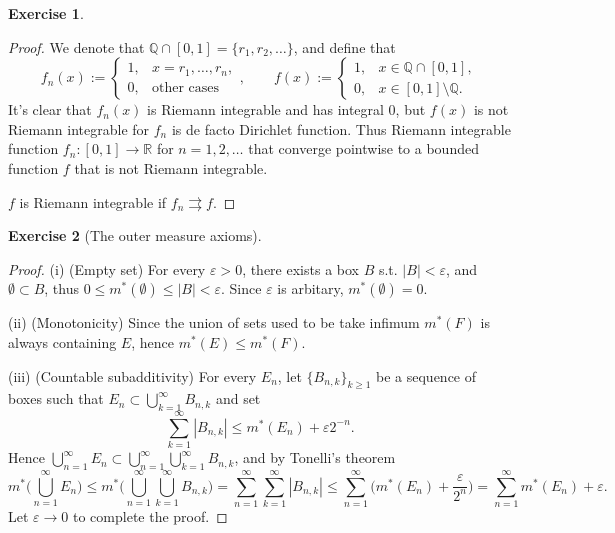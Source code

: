 \documentclass{article}
\newtheorem{ex}{Exercise}[subsection]
\begin{document}
\begin{ex}\end{ex}
\begin{proof}
We denote that $\mathbb{Q} \cap [0, 1] = \{r_1, r_2, \dots\}$, and define that $$
f_n(x) := \begin{cases}
    1, &x = r_1, \dots, r_n,\\
    0, &\text{other cases}
\end{cases}, \qquad
f(x) := \begin{cases}
    1, &x \in \mathbb{Q} \cap [0, 1],\\
    0, &x \in [0, 1]\setminus \mathbb{Q}.
\end{cases}
$$
It's clear that $f_n(x)$ is Riemann integrable and has integral 0, but $f(x)$ is not Riemann integrable for $f_n$
is de facto Dirichlet function. Thus Riemann integrable function $f_n: [0, 1] \to \mathbb{R}$ for $n = 1, 2, \dots$
that converge pointwise to  a bounded function $f$ that is not Riemann integrable.

$f$ is Riemann integrable if $f_n \rightrightarrows f$.
\end{proof}

\begin{ex}[The outer measure axioms]\end{ex}
\begin{proof}
(i) (Empty set) For every $\varepsilon > 0$, there exists a box $B$ s.t. $|B| < \varepsilon$, and
$\emptyset \subset B$, thus $0 \leq m^*(\emptyset) \leq |B| < \varepsilon$. Since $\varepsilon$ is arbitary, 
$m^*(\emptyset) = 0$.

(ii) (Monotonicity) Since the union of sets used to be take infimum $m^*(F)$ is always containing $E$, hence 
$m^*(E) \leq m^*(F)$.

(iii) (Countable subadditivity) For every $E_n$, let $\{B_{n, k}\}_{k \geq 1}$ be a sequence of boxes such that 
$E_n \subset \bigcup_{k = 1}^\infty B_{n, k}$ and set $$
\sum_{k = 1}^\infty |B_{n, k}| \leq m^*(E_n) + \varepsilon 2^{-n}.
$$
Hence $\bigcup_{n = 1}^\infty E_n \subset \bigcup_{n = 1}^\infty \bigcup_{k = 1}^\infty B_{n, k}$, and by Tonelli's
theorem $$
m^*\Big( \bigcup_{n = 1}^\infty E_n \Big) \leq m^*\Big(\bigcup_{n = 1}^\infty \bigcup_{k = 1}^\infty B_{n, k}\Big)
= \sum_{n = 1}^\infty \sum_{k = 1}^\infty |B_{n, k}| \leq \sum_{n = 1}^\infty \Big(m^*(E_n) + \frac{\varepsilon}{2^n}\Big)
= \sum_{n = 1}^\infty m^*(E_n) + \varepsilon.
$$Let $\varepsilon \to 0$ to complete the proof.
\end{proof}
\end{document}
